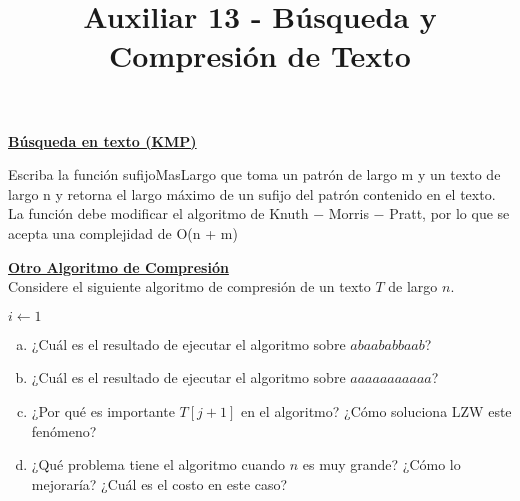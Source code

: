 \documentclass[dcc,uchile]{fcfmcourse}
\title{Auxiliar 13 - Búsqueda y Compresión de Texto}
\newcommand{\ptitle}[1]{\underline{\textbf{#1}}}
\begin{document}
\maketitle

\vspace{-1ex}


\begin{problems}


\problem \ptitle{Búsqueda en texto (KMP)}

Escriba la función sufijoMasLargo que toma un patrón de largo m y un texto de largo n y retorna el largo máximo de un sufijo del patrón contenido en el texto.
La función debe modificar el algoritmo de Knuth − Morris − Pratt, por lo que se acepta una complejidad de O(n + m)

\problem \ptitle{Otro Algoritmo de Compresión}\\
Considere el siguiente algoritmo de compresión de un texto $T$ de largo $n$.\\
\begin{algorithm}[H]
\SetAlgoLined
{}
 $i\gets 1$\;
\end{algorithm}
\begin{enumerate}[a)]
    \item ¿Cuál es el resultado de ejecutar el algoritmo sobre $abaababbaab$?
    \item ¿Cuál es el resultado de ejecutar el algoritmo sobre $aaaaaaaaaaa$?
    \item ¿Por qué es importante $T[j+1]$ en el algoritmo? ¿Cómo soluciona LZW este fenómeno?
    \item ¿Qué problema tiene el algoritmo cuando $n$ es muy grande? ¿Cómo lo mejoraría? ¿Cuál es el costo en este caso?
\end{enumerate}
\end{problems}
\end{document}
